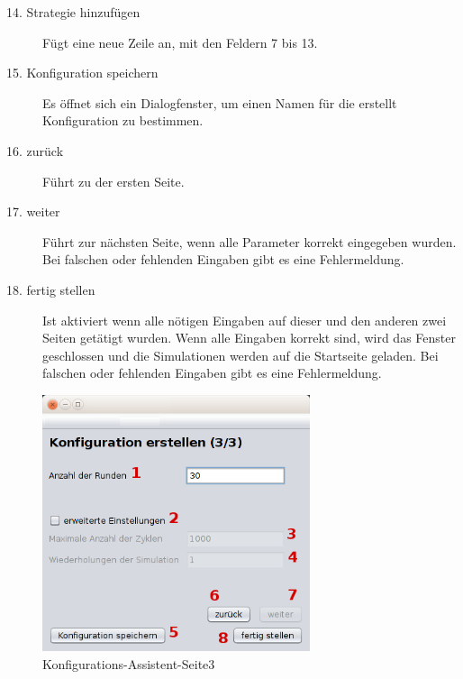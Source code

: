 \begin{description}
\item[14. Strategie hinzufügen] Fügt eine neue Zeile an, mit den Feldern 7 bis 13.

\item[15. Konfiguration speichern] Es öffnet sich ein Dialogfenster, um einen Namen für die erstellt Konfiguration zu bestimmen.

\item[16. zurück] Führt zu der ersten Seite.

\item[17. weiter] Führt zur nächsten Seite, wenn alle Parameter korrekt eingegeben wurden. Bei falschen oder fehlenden Eingaben gibt es eine Fehlermeldung.

\item[18. fertig stellen] Ist aktiviert wenn alle nötigen Eingaben auf dieser und den anderen zwei Seiten getätigt wurden. Wenn alle Eingaben korrekt sind, wird das Fenster geschlossen und die Simulationen werden auf die Startseite geladen. Bei falschen oder fehlenden Eingaben gibt es eine Fehlermeldung.

\end{description}

\pagebreak

\begin{figure}[hp] 
  \centering
     \includegraphics[width=0.7\textwidth]{GUI_Entwurf/WizardFenster3.png}
  \caption{Konfigurations-Assistent-Seite3}
  \label{fig:Bild4}
\end{figure}

